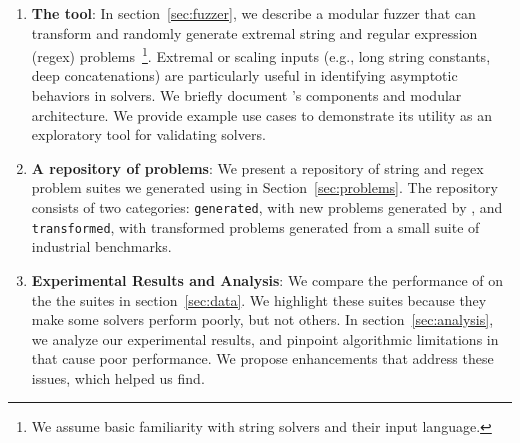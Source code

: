 \begin{enumerate}
\item \textbf{The \fuzzer{} tool}:
    In section~\ref{sec:fuzzer}, we describe a modular fuzzer that can transform and
    randomly generate extremal \smtfull{} string and regular expression
    (regex) problems~\footnote{We assume basic
    familiarity with string solvers and their input
    language.}. Extremal or scaling inputs (e.g., long string
    constants, deep concatenations) are particularly useful in
    identifying asymptotic behaviors in solvers. We briefly document \fuzzer{}'s
    components and modular architecture. We provide example use cases to
    demonstrate its utility as an exploratory tool for validating
    solvers.

\item \textbf{A repository of \smtfull{} problems}:
    We present a repository of \smtfull{} string and regex problem suites we
    generated using \fuzzer{} in Section~\ref{sec:problems}. The repository
    consists of two categories: \texttt{generated}, with new problems generated
    by \fuzzer{}, and \texttt{transformed}, with transformed problems generated
    from a small suite of industrial benchmarks.

\item \textbf{Experimental Results and Analysis}:
    We compare the performance of \theSolvers{} on the
    the \fuzzer{} suites \theSuites{} in section~\ref{sec:data}. We highlight
    these suites because they make some solvers perform poorly,
    but not others. In section~\ref{sec:analysis}, we analyze our
    experimental results, and pinpoint algorithmic limitations
    in \us{} that cause poor performance. We propose enhancements that
    address these issues, which \fuzzer{} helped us find.
\end{enumerate}

